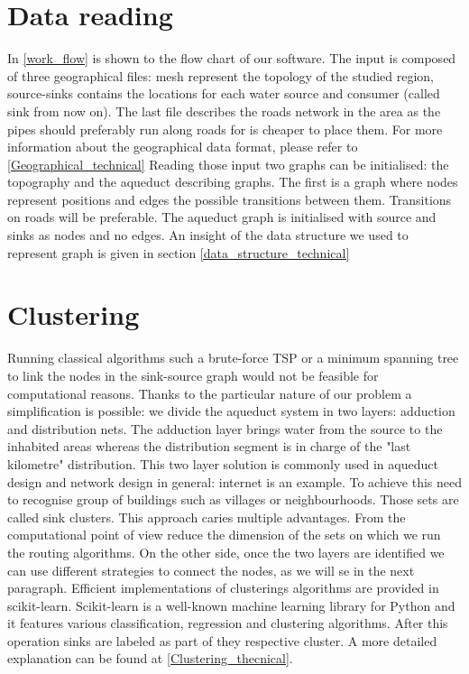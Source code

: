 

\section{Data reading}
In \ref {work_flow} is shown to the flow chart of our software. 
The input is composed of three geographical files: mesh represent the topology of the studied region, source-sinks contains the locations for each water source and consumer (called sink from now on). The last file describes the roads network in the area as the pipes should preferably run along roads for is cheaper to place them. For more information about the geographical data format, please refer to \ref{Geographical_technical}
Reading those input two graphs can be initialised: the topography and the aqueduct describing graphs. The first is a graph where nodes represent positions and edges the possible transitions between them. Transitions on roads will be preferable. The aqueduct graph is initialised with source and sinks as nodes and no edges. An insight of the data structure we used to represent graph is given in section \ref {data_structure_technical}



\section{Clustering}
Running classical algorithms such a brute-force TSP or a minimum spanning tree to link
the nodes in the sink-source graph would not be feasible for computational reasons. 
Thanks to the particular nature of our problem a simplification is possible: we divide the aqueduct system
in two layers: adduction and distribution nets. The adduction layer brings water from the
source to the inhabited areas whereas the distribution segment is in charge of the "last
kilometre" distribution. This two layer solution is commonly used in aqueduct design and
network design in general: internet is an example.
To achieve this need to recognise group of buildings such as villages or neighbourhoods. Those sets are called sink clusters.
This approach caries multiple advantages. From the computational point of view reduce the dimension of the sets on which we run the routing algorithms.  On the other side, once the two layers are identified we can use different strategies to connect the nodes, as we will se in the next paragraph.
Efficient implementations of clusterings algorithms are provided in scikit-learn. Scikit-learn is a well-known
machine learning library for Python and it features various classification, regression and
clustering algorithms. After this operation sinks are labeled as part of they respective cluster. A more detailed explanation can be found at \ref {Clustering_thecnical}.

